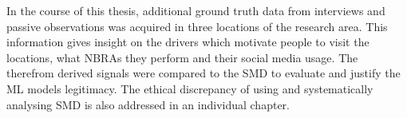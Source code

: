 \newline
In the course of this thesis, additional ground truth data from interviews and passive observations was acquired in three locations of the research area. This information gives insight on the drivers which motivate people to visit the locations, what NBRAs they perform and their social media usage. The therefrom derived signals were compared to the SMD \parencite{Wartmann2018} to evaluate and justify the ML models legitimacy. The ethical discrepancy of using and systematically analysing SMD is also addressed in an individual chapter.
